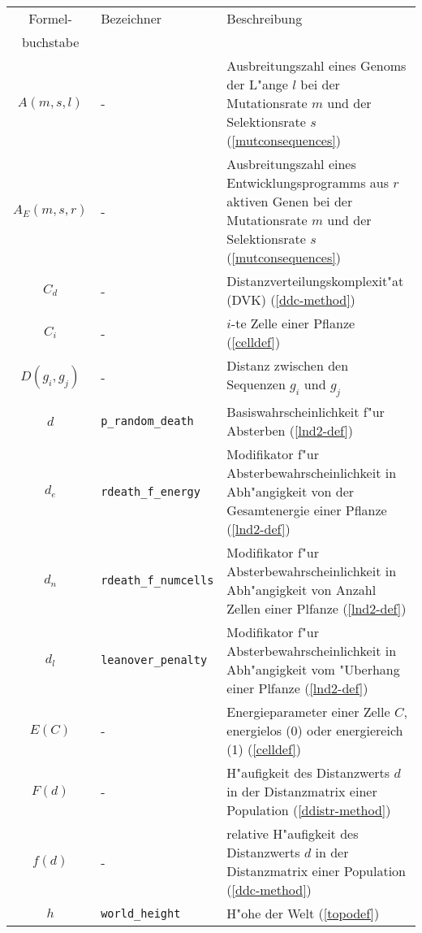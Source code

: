 \begin{appendix}
\noindent\begin{tabularx}{\linewidth}{|c|l|X|} \hline
Formel-      & Bezeichner               & Beschreibung \\
buchstabe    &                          & \\ \hline
$A(m, s, l)$ & -                        & Ausbreitungszahl eines Genoms der L"ange $l$ bei der Mutationsrate $m$
                                          und der Selektionsrate $s$ (\ref{mutconsequences}) \\
$A_E(m, s, r)$ & -                      & Ausbreitungszahl eines Entwicklungsprogramms aus $r$ aktiven Genen bei der Mutationsrate $m$
                                          und der Selektionsrate $s$ (\ref{mutconsequences}) \\
$C_d$        & -                        & Distanzverteilungskomplexit"at (DVK) (\ref{ddc-method}) \\
$C_i$        & -                        & $i$-te Zelle einer Pflanze (\ref{celldef}) \\
$D(g_i,g_j)$ & -                        & Distanz zwischen den Sequenzen $g_i$ und $g_j$ \\
$d$          & \verb|p_random_death|    & Basiswahrscheinlichkeit f"ur Absterben (\ref{lnd2-def}) \\
$d_e$        & \verb|rdeath_f_energy|   & Modifikator f"ur Absterbewahrscheinlichkeit in Abh"angigkeit
                                          von der Gesamtenergie einer Pflanze (\ref{lnd2-def}) \\
$d_n$        & \verb|rdeath_f_numcells| & Modifikator f"ur Absterbewahrscheinlichkeit in Abh"angigkeit von Anzahl Zellen 
					  einer Plfanze (\ref{lnd2-def}) \\
$d_l$        & \verb|leanover_penalty|  & Modifikator f"ur Absterbewahrscheinlichkeit in Abh"angigkeit vom "Uberhang 
					  einer Plfanze (\ref{lnd2-def}) \\
$E(C)$       & -                        & Energieparameter einer Zelle $C$, energielos (0) oder energiereich (1)
					  (\ref{celldef}) \\
$F(d)$       & -                        & H"aufigkeit des Distanzwerts $d$ in der Distanzmatrix einer
					  Population (\ref{ddistr-method})\\
$f(d)$       & -                        & relative H"aufigkeit des Distanzwerts $d$ in der Distanzmatrix
					  einer Population (\ref{ddc-method}) \\
$h$          & \verb|world_height|      & H"ohe der Welt (\ref{topodef}) \\

\end{tabularx}
\end{appendix}
